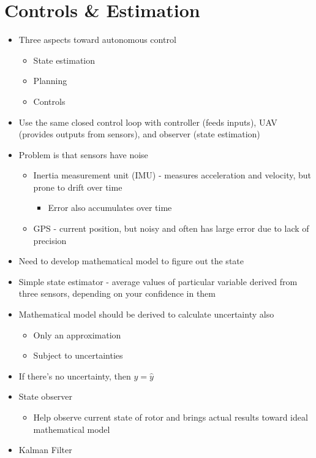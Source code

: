 \documentclass{article}
\begin{document}
\section*{Controls \& Estimation}
\begin{itemize}
\item Three aspects toward autonomous control
\begin{itemize}
\item State estimation
\item Planning
\item Controls
\end{itemize}

\item Use the same closed control loop with controller (feeds inputs), UAV (provides outputs from sensors), and observer (state estimation)
\item Problem is that sensors have noise\begin{itemize}
\item Inertia measurement unit (IMU) - measures acceleration and velocity, but prone to drift over time\begin{itemize}
		\item Error also accumulates over time
		\end{itemize}
\item GPS - current position, but noisy and often has large error due to lack of precision
\end{itemize}
\item Need to develop mathematical model to figure out the state
\item Simple state estimator - average values of particular variable derived from three  sensors, depending on your confidence in them
\item Mathematical model should be derived to calculate uncertainty also\begin{itemize}
\item Only an approximation
\item Subject to uncertainties
\end{itemize}
\item If there's no uncertainty, then $y=\hat{y}$
\item State observer
\begin{itemize}
\item Help observe current state of rotor and brings actual results toward ideal mathematical model
\end{itemize}
\item Kalman Filter\begin{itemize}

\end{itemize}
\end{itemize}
\end{document}
